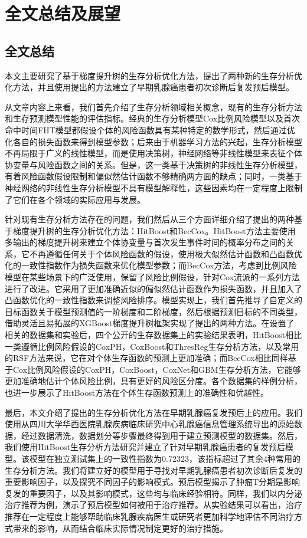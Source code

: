 \chapter{全文总结及展望}

\section{全文总结}
本文主要研究了基于梯度提升树的生存分析优化方法，提出了两种新的生存分析优化方法，并且使用提出的方法建立了早期乳腺癌患者初次诊断后复发预后模型。

从文章内容上来看，我们首先介绍了生存分析领域相关概念，现有的生存分析方法和生存预测模型性能的评估指标。经典的生存分析模型Cox比例风险模型以及首次命中时间FHT模型都假设个体的风险函数具有某种特定的数学形式，然后通过优化各自的损失函数来得到模型参数；后来由于机器学习方法的兴起，生存分析模型不再局限于广义的线性模型，而是使用决策树，神经网络等非线性模型来表征个体协变量与风险函数之间的关系。但是，这一类基于决策树的非线性生存分析模型，有着风险函数假设限制和偏似然估计函数不够精确两方面的缺点；同时，一类基于神经网络的非线性生存分析模型不具有模型解释性，这些因素均在一定程度上限制了它们在各个领域的实际应用与发展。

针对现有生存分析方法存在的问题，我们然后从三个方面详细介绍了提出的两种基于梯度提升树的生存分析优化方法：HitBoost和BecCox。HitBoost方法主要使用多输出的梯度提升树来建立个体协变量与首次发生事件时间的概率分布之间的关系，它不再遵循任何关于个体风险函数的假设，使用极大似然估计函数和凸函数优化的一致性指数作为损失函数来优化模型参数；而BecCox方法，考虑到比例风险模型在某些场景下的广泛使用，保留了风险比例假设，针对Cox流派的一系列方法进行了改进。它采用了更加准确近似的偏似然估计函数作为损失函数，并且加入了凸函数优化的一致性指数来调整风险排序。模型实现上，我们首先推导了自定义的目标函数关于模型预测值的一阶梯度和二阶梯度，然后根据预测目标的不同类型，借助灵活且易拓展的XGBoost梯度提升树框架实现了提出的两种方法。在设置了相关的数据集和实验后，四个公开的生存数据集上的实验结果表明，HitBoost相比一类遵循比例风险假设的CoxPH，CoxBoost和ThresReg生存分析方法，以及常用的RSF方法来说，它在对个体生存函数的预测上更加准确；而BecCox相比同样基于Cox比例风险假设的CoxPH，CoxBoost，CoxNet和GBM生存分析方法，它能够更加准确地估计个体风险比例，具有更好的风险区分度。各个数据集的样例分析，也进一步展示了HitBoost方法在个体生存函数预测上的准确性和优越性。

最后，本文介绍了提出的生存分析优化方法在早期乳腺癌复发预后上的应用。我们使用从四川大学华西医院乳腺疾病临床研究中心乳腺癌信息管理系统导出的原始数据，经过数据清洗，数据划分等步骤最终得到用于建立预测模型的数据集。然后，我们使用HitBoost生存分析方法研究并建立了针对早期乳腺癌患者的复发预后模型。该模型在独立测试集上的一致性指数为0.72323，该指标超过了其余4种常用的生存分析方法。我们将建立好的模型用于寻找对早期乳腺癌患者初次诊断后复发的重要影响因子，以及探究不同因子的影响模式。预后模型揭示了肿瘤T分期是影响复发的重要因子，以及其影响模式，这些均与临床经验相符。同样，我们以内分泌治疗推荐为例，演示了预后模型如何被用于治疗推荐。从实验结果可以看出，治疗推荐在一定程度上能够帮助临床乳腺疾病医生或研究者更加科学地评估不同治疗方式带来的影响，从而结合临床实际情况制定更好的治疗措施。

